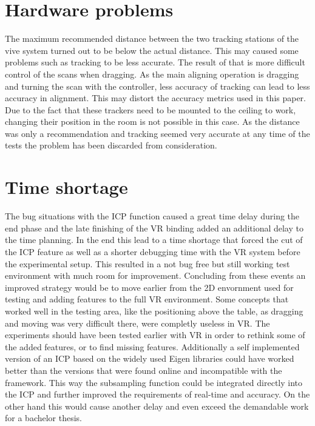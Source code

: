 \documentclass[hyperref,english,bachelorofscience,bibnum,twoside]{cgvpub}
\begin{document}
\section{Hardware problems}

The maximum recommended distance between the two tracking stations of the vive system turned out to be below the actual distance. This may caused some problems such as tracking to be less accurate. The result of that is more difficult control of the scans when dragging. As the main aligning operation is dragging and turning the scan with the controller, less accuracy of tracking can lead to less accuracy in alignment. This may distort the accuracy metrics used in this paper. Due to the fact that these trackers need to be mounted to the ceiling to work, changing their position in the room is not possible in this case. As the distance was only a recommendation and tracking seemed very accurate at any time of the tests the problem has been discarded from consideration.

\section{Time shortage}

The bug situations with the ICP function caused a great time delay during the end phase and the late finishing of the VR binding added an additional delay to the time planning. In the end this lead to a time shortage that forced the cut of the ICP feature as well as a shorter debugging time with the VR system before the experimental setup. This resulted in a not bug free but still working test environment with much room for improvement. Concluding from these events an improved strategy would be to move earlier from the 2D envornment used for testing and adding features to the full VR environment. Some concepts that worked well in the testing area, like the positioning above the table, as dragging and moving was very difficult there, were completly useless in VR. The experiments should have been tested earlier with VR in order to rethink some of the added features, or to find missing features. Additionally a self implemented version of an ICP based on the widely used Eigen libraries could have worked better than the versions that were found online and incompatible with the framework. This way the subsampling function could be integrated directly into the ICP and further improved the requirements of real-time and accuracy. On the other hand this would cause another delay and even exceed the demandable work for a bachelor thesis.
\end{document}
